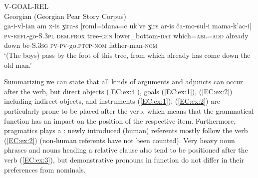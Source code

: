 \documentclass[output=paper,colorlinks,citecolor=brown,draftmode]{langscibook}
\begin{document}
\begin{table}
 \caption{Position of head noun of relative clause and heaviness (including relative clauses; all semantic roles)}
 \label{EC:tab:5}
\end{table}


\ea\label{EC:ex:3}
V-GOAL-REL \\
Georgian (Georgian Pear Story Corpus) \\
\gll ga-i-vl-ian am x-is ʒira-s [roml=idana=c uk've ʒirs ar-is ča-mo-sul-i mama-k'ac-i] \\
\textsc{pv-refl-}go\textsc{-S.3pl} \textsc{dem.prox} tree\textsc{-gen} lower\_bottom\textsc{-dat} which\textsc{=abl=add} already down be\textsc{-S.3sg} \textsc{pv-pv-}go\textsc{.ptcp-nom} father-man\textsc{-nom} \\
\glt `(The boys) pass by the foot of this tree, from which already has come down the old man.'
\z

Summarizing we can state that all kinds of arguments and adjuncts can occur after the verb, but direct objects (\ref{EC:ex:4}), goals (\ref{EC:ex:1}), (\ref{EC:ex:2}) including indirect objects, and instruments (\ref{EC:ex:1}), (\ref{EC:ex:2}) are particularly prone to be placed after the verb, which means that the grammatical function has an impact on the position of the respective item. Furthermore, pragmatics plays a : newly introduced (human) referents mostly follow the verb (\ref{EC:ex:2}) (non-human referents have not been counted). Very heavy noun phrases and nouns heading a relative clause also tend to be positioned after the verb (\ref{EC:ex:3}), but demonstrative pronouns in 
function do not differ in their preferences from nominals. 
\end{document}
